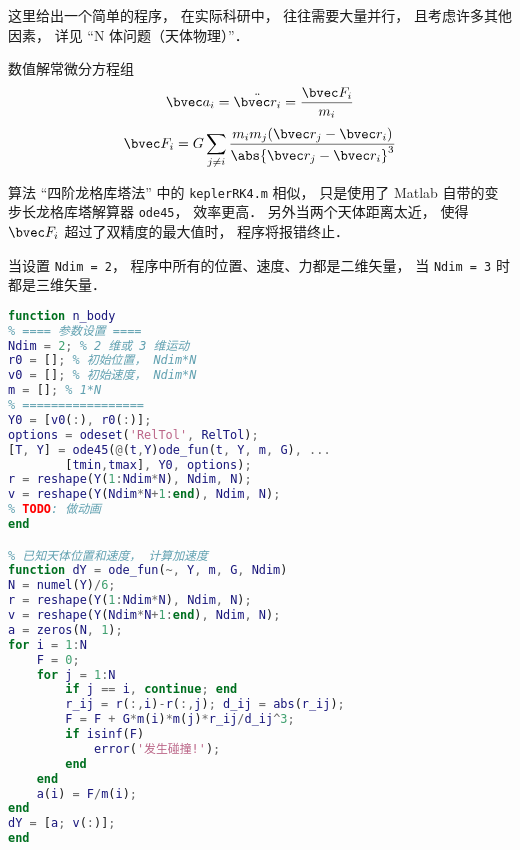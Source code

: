 
\begin{issues}
\issueDraft
\end{issues}


这里给出一个简单的程序， 在实际科研中， 往往需要大量并行， 且考虑许多其他因素， 详见 “N 体问题（天体物理）”．

数值解常微分方程组
\begin{equation}
\bvec a_i = \ddot{\bvec r_i} = \frac{\bvec F_i}{m_i}
\end{equation}
\begin{equation}
\bvec F_i = G\sum_{j\ne i} \frac{m_i m_j(\bvec r_j - \bvec r_i)}{\abs{\bvec r_j - \bvec r_i}^3}
\end{equation}

算法 “四阶龙格库塔法” 中的 \verb|keplerRK4.m| 相似， 只是使用了 Matlab 自带的变步长龙格库塔解算器 \verb|ode45|， 效率更高． 另外当两个天体距离太近， 使得 $\bvec F_i$ 超过了双精度的最大值时， 程序将报错终止．

当设置 \verb|Ndim = 2|， 程序中所有的位置、速度、力都是二维矢量， 当 \verb|Ndim = 3| 时都是三维矢量．

\begin{lstlisting}[language=matlab]
% N 体问题（支持二维或三维）
function n_body
% ==== 参数设置 ====
Ndim = 2; % 2 维或 3 维运动
r0 = []; % 初始位置， Ndim*N
v0 = []; % 初始速度， Ndim*N
m = []; % 1*N
% =================
Y0 = [v0(:), r0(:)];
options = odeset('RelTol', RelTol);
[T, Y] = ode45(@(t,Y)ode_fun(t, Y, m, G), ...
        [tmin,tmax], Y0, options);
r = reshape(Y(1:Ndim*N), Ndim, N);
v = reshape(Y(Ndim*N+1:end), Ndim, N);
% TODO: 做动画
end

% 已知天体位置和速度， 计算加速度
function dY = ode_fun(~, Y, m, G, Ndim)
N = numel(Y)/6;
r = reshape(Y(1:Ndim*N), Ndim, N);
v = reshape(Y(Ndim*N+1:end), Ndim, N);
a = zeros(N, 1);
for i = 1:N
    F = 0;
    for j = 1:N
        if j == i, continue; end
        r_ij = r(:,i)-r(:,j); d_ij = abs(r_ij);
        F = F + G*m(i)*m(j)*r_ij/d_ij^3;
        if isinf(F)
            error('发生碰撞!');
        end
    end
    a(i) = F/m(i);
end
dY = [a; v(:)];
end
\end{lstlisting}
